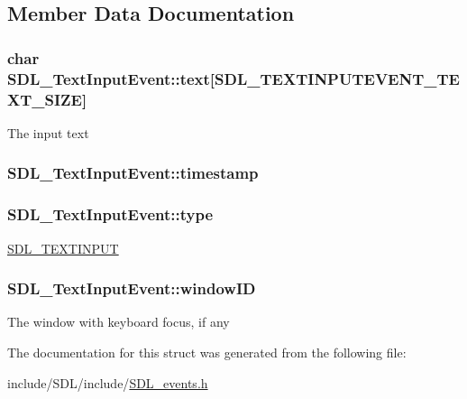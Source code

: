 \subsection{Member Data Documentation}
\hypertarget{struct_s_d_l___text_input_event_a1a95531f466dff01c2f108f53ff24554}{
\subsubsection[{text}]{\setlength{\rightskip}{0pt plus 5cm}char S\-D\-L\-\_\-\-Text\-Input\-Event\-::text\mbox{[}{\bf S\-D\-L\-\_\-\-T\-E\-X\-T\-I\-N\-P\-U\-T\-E\-V\-E\-N\-T\-\_\-\-T\-E\-X\-T\-\_\-\-S\-I\-Z\-E}\mbox{]}}}\label{struct_s_d_l___text_input_event_a1a95531f466dff01c2f108f53ff24554}
The input text \hypertarget{struct_s_d_l___text_input_event_a20b190a96494918690ea7f99187be948}{
\subsubsection[{timestamp}]{ S\-D\-L\-\_\-\-Text\-Input\-Event\-::timestamp}}\label{struct_s_d_l___text_input_event_a20b190a96494918690ea7f99187be948}
\hypertarget{struct_s_d_l___text_input_event_a90576be2ea52e694deff40d0586654f5}{
\subsubsection[{type}]{ S\-D\-L\-\_\-\-Text\-Input\-Event\-::type}}\label{struct_s_d_l___text_input_event_a90576be2ea52e694deff40d0586654f5}
\hyperlink{_s_d_l__events_8h_a3b589e89be6b35c02e0dd34a55f3fccaa4fa2570088f6b9cbd109ae91b511368f}{S\-D\-L\-\_\-\-T\-E\-X\-T\-I\-N\-P\-U\-T} \hypertarget{struct_s_d_l___text_input_event_aeb4f7a939353990ca40261ffbfbeb3d0}{
\subsubsection[{window\-I\-D}]{ S\-D\-L\-\_\-\-Text\-Input\-Event\-::window\-I\-D}}\label{struct_s_d_l___text_input_event_aeb4f7a939353990ca40261ffbfbeb3d0}
The window with keyboard focus, if any 

The documentation for this struct was generated from the following file\-:\begin{DoxyCompactItemize}
\item 
include/\-S\-D\-L/include/\hyperlink{_s_d_l__events_8h}{S\-D\-L\-\_\-events.\-h}\end{DoxyCompactItemize}
